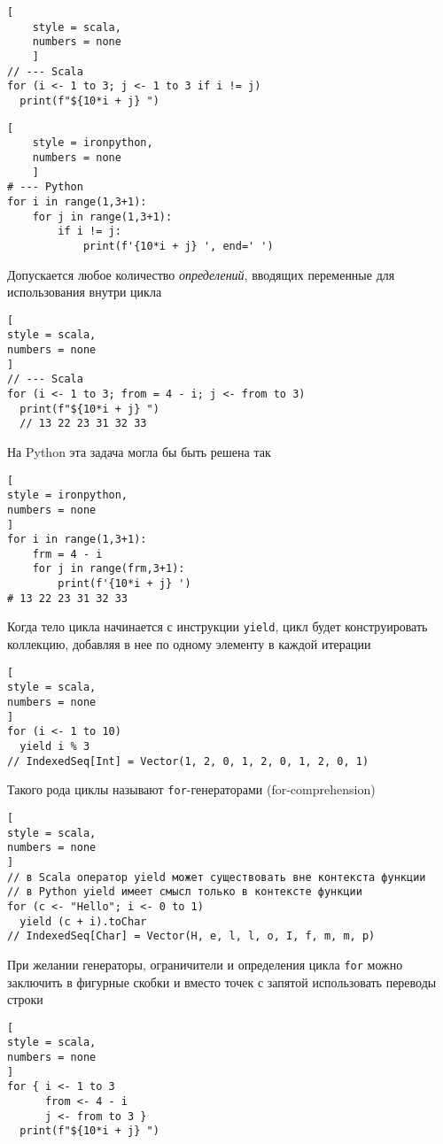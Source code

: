 \documentclass[%
	11pt,
	a4paper,
	utf8,
		]{article}
\begin{document}
\begin{minipage}[t]{0.48\textwidth}
	\begin{lstlisting}[
	style = scala,
	numbers = none
	]
// --- Scala
for (i <- 1 to 3; j <- 1 to 3 if i != j)
  print(f"${10*i + j} ")
	\end{lstlisting}
\end{minipage}
\hspace*{4mm}
\begin{minipage}[t]{0.45\textwidth}
	\begin{lstlisting}[
	style = ironpython,
	numbers = none
	]
# --- Python
for i in range(1,3+1):
    for j in range(1,3+1):
        if i != j:
            print(f'{10*i + j} ', end=' ')
	\end{lstlisting}
\end{minipage}

Допускается любое количество \emph{определений}, вводящих переменные для использования внутри цикла

\begin{lstlisting}[
style = scala,
numbers = none
]
// --- Scala
for (i <- 1 to 3; from = 4 - i; j <- from to 3)
  print(f"${10*i + j} ")
  // 13 22 23 31 32 33
\end{lstlisting}

На Python эта задача могла бы быть решена так
\begin{lstlisting}[
style = ironpython,
numbers = none
]
for i in range(1,3+1):
    frm = 4 - i
	for j in range(frm,3+1):
	    print(f'{10*i + j} ')
# 13 22 23 31 32 33
\end{lstlisting}

Когда тело цикла начинается с инструкции \texttt{yield}, цикл будет конструировать коллекцию, добавляя в нее по одному элементу в каждой итерации
\begin{lstlisting}[
style = scala,
numbers = none
]
for (i <- 1 to 10)
  yield i % 3
// IndexedSeq[Int] = Vector(1, 2, 0, 1, 2, 0, 1, 2, 0, 1)
\end{lstlisting}

Такого рода циклы называют \texttt{for}-генераторами (for-comprehension)
\begin{lstlisting}[
style = scala,
numbers = none
]
// в Scala оператор yield может существовать вне контекста функции
// в Python yield имеет смысл только в контексте функции
for (c <- "Hello"; i <- 0 to 1)
  yield (c + i).toChar
// IndexedSeq[Char] = Vector(H, e, l, l, o, I, f, m, m, p)
\end{lstlisting}

При желании генераторы, ограничители и определения цикла \texttt{for} можно заключить в фигурные скобки и вместо точек с запятой использовать переводы строки
\begin{lstlisting}[
style = scala,
numbers = none
]
for { i <- 1 to 3
      from <- 4 - i
      j <- from to 3 }
  print(f"${10*i + j} ")
\end{lstlisting}
\end{document}
